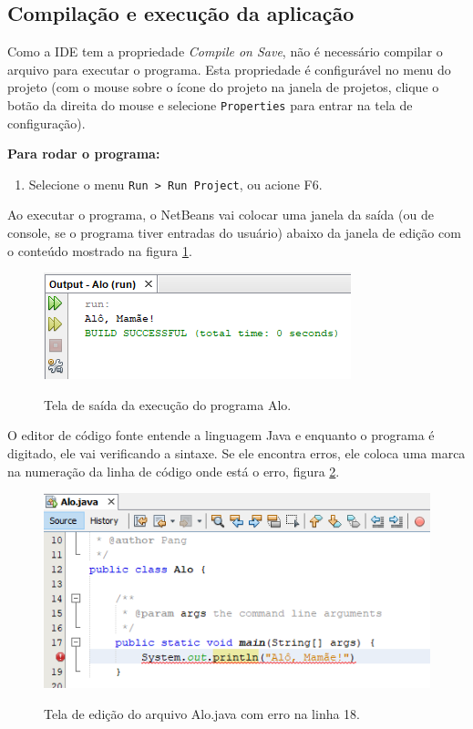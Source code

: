 \documentclass[
	12pt,				%
	twoside,			%
	a4paper,			%
	english,			%
	french,				%
	spanish,			%
	brazil				%
	]{abntex2}
\begin{document}
\subsection{Compilação e execução da aplicação}

Como a IDE tem a propriedade \emph{Compile on Save}, não é necessário compilar o arquivo para executar o programa. Esta propriedade é configurável no menu do projeto (com o mouse sobre o ícone do projeto na janela de projetos, clique o botão da direita do mouse e selecione \texttt{Properties} para entrar na tela de configuração).

\textbf{Para rodar o programa:}
\begin{enumerate}
\item Selecione o menu \texttt{Run > Run Project}, ou acione F6.
\end{enumerate}

Ao executar o programa, o NetBeans vai colocar uma janela da saída (ou de console, se o programa tiver entradas do usuário) abaixo da janela de edição com o conteúdo mostrado na figura \ref{fig:saidaAlo}.

\begin{figure}[h]
\begin{center}
\includegraphics[scale=0.5]{winOut.png} 
\caption{Tela de saída da execução do programa Alo.}
\label{fig:saidaAlo}
\end{center}
\end{figure}

O editor de código fonte entende a linguagem Java e enquanto o programa é digitado, ele vai verificando a sintaxe. Se ele encontra erros, ele coloca uma marca na numeração da linha de código onde está o erro, figura \ref{fig:errorEd}.

\begin{figure}[h]
\begin{center}
\includegraphics[scale=0.4]{compErr.png} 
\caption{Tela de edição do arquivo Alo.java com erro na linha 18.}
\label{fig:errorEd}
\end{center}
\end{figure}
\end{document}
